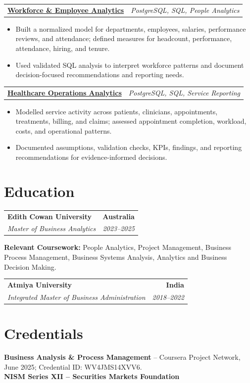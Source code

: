 \documentclass[letterpaper,10pt]{article}
\makeatletter
\newcommand{\role}[4]{%
  \begin{tabularx}{\textwidth}{@{}Xr@{}}
    \textbf{#1} & \textbf{#2} \\
    \textit{#3} & \textit{#4}
  \end{tabularx}\vspace{-1pt}
}
\newcommand{\project}[2]{%
  \begin{tabularx}{\textwidth}{@{}Xr@{}}
    \textbf{#1} & \textit{#2}
  \end{tabularx}\vspace{-1pt}
}
\makeatother
\begin{document}
\project{\href{https://github.com/jainalimehta/HR-Analytics}{Workforce \& Employee Analytics}}{PostgreSQL, SQL, People Analytics}
\begin{itemize}
  \item Built a normalized model for departments, employees, salaries, performance reviews, and attendance; defined measures for headcount, performance, attendance, hiring, and tenure.
  \item Used validated SQL analysis to interpret workforce patterns and document decision-focused recommendations and reporting needs.
\end{itemize}
\vspace{1pt}

\project{\href{https://github.com/jainalimehta/Healthcare-Analytics}{Healthcare Operations Analytics}}{PostgreSQL, SQL, Service Reporting}
\begin{itemize}
  \item Modelled service activity across patients, clinicians, appointments, treatments, billing, and claims; assessed appointment completion, workload, costs, and operational patterns.
  \item Documented assumptions, validation checks, KPIs, findings, and reporting recommendations for evidence-informed decisions.
\end{itemize}

\section{Education}
\role{Edith Cowan University}{Australia}{Master of Business Analytics}{2023--2025}
\small\textbf{Relevant Coursework:} People Analytics, Project Management, Business Process Management, Business Systems Analysis, Analytics and Business Decision Making.\\[2pt]
\role{Atmiya University}{India}{Integrated Master of Business Administration}{2018--2022}

\section{Credentials}
\small\textbf{Business Analysis \& Process Management} -- Coursera Project Network, June 2025; Credential ID: WV4JMS14XVV6.\\[-0.2pt]
\small\textbf{NISM Series XII -- Securities Markets Foundation}
\end{document}
